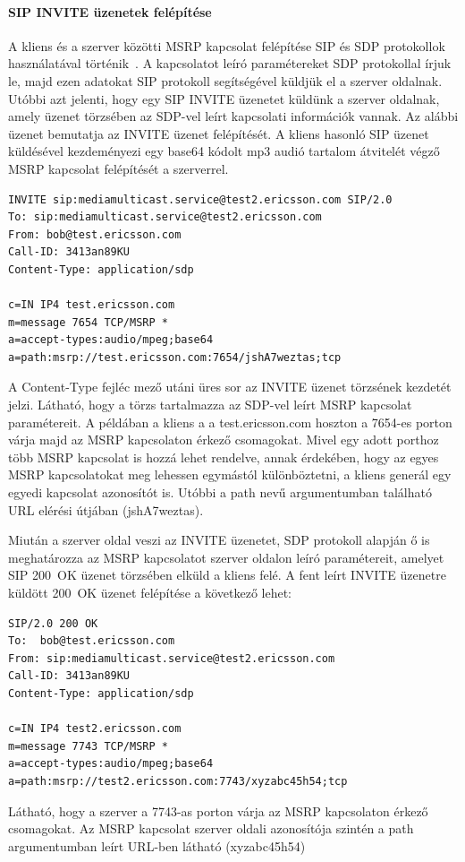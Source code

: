 \paragraph{SIP INVITE üzenetek felépítése\\}
\label{sec:sip_invite}

A kliens és a szerver közötti MSRP kapcsolat felépítése SIP és SDP protokollok használatával történik~\cite{rfc4975}. A kapcsolatot leíró paramétereket SDP protokollal írjuk le, majd ezen adatokat SIP protokoll segítségével küldjük el a szerver oldalnak. Utóbbi azt jelenti, hogy egy SIP INVITE üzenetet küldünk a szerver oldalnak, amely üzenet törzsében az SDP-vel leírt kapcsolati információk vannak. Az alábbi üzenet bemutatja az INVITE üzenet felépítését. A kliens hasonló SIP üzenet küldésével kezdeményezi egy base64 kódolt mp3 audió tartalom átvitelét végző MSRP kapcsolat felépítését a szerverrel.
\medskip
\fontsize{10}{10}
\begin{verbatim}
INVITE sip:mediamulticast.service@test2.ericsson.com SIP/2.0
To: sip:mediamulticast.service@test2.ericsson.com
From: bob@test.ericsson.com
Call-ID: 3413an89KU
Content-Type: application/sdp

c=IN IP4 test.ericsson.com
m=message 7654 TCP/MSRP *
a=accept-types:audio/mpeg;base64
a=path:msrp://test.ericsson.com:7654/jshA7weztas;tcp
\end{verbatim}
\fontsize{12}{12} 
\medskip
A Content-Type fejléc mező utáni üres sor az INVITE üzenet törzsének kezdetét jelzi. Látható, hogy a  törzs tartalmazza az SDP-vel leírt MSRP kapcsolat paramétereit. A példában a kliens a a test.ericsson.com hoszton a 7654-es porton várja majd az MSRP kapcsolaton érkező csomagokat. Mivel egy adott porthoz több MSRP kapcsolat is hozzá lehet rendelve, annak érdekében, hogy az egyes MSRP kapcsolatokat meg lehessen egymástól különböztetni, a kliens generál egy egyedi kapcsolat azonosítót is. Utóbbi a path nevű argumentumban található URL elérési útjában (jshA7weztas). 

Miután a szerver oldal veszi az INVITE üzenetet, SDP protokoll alapján ő is meghatározza az MSRP kapcsolatot szerver oldalon leíró paramétereit, amelyet SIP 200~OK üzenet törzsében elküld a kliens felé. A fent leírt INVITE üzenetre küldött 200~OK üzenet felépítése a következő lehet:
\medskip
\fontsize{10}{10}
\begin{verbatim}
SIP/2.0 200 OK
To:  bob@test.ericsson.com
From: sip:mediamulticast.service@test2.ericsson.com
Call-ID: 3413an89KU
Content-Type: application/sdp

c=IN IP4 test2.ericsson.com
m=message 7743 TCP/MSRP *
a=accept-types:audio/mpeg;base64
a=path:msrp://test2.ericsson.com:7743/xyzabc45h54;tcp
\end{verbatim}
\fontsize{12}{12} 
\medskip
Látható, hogy a szerver a 7743-as porton várja az MSRP kapcsolaton érkező csomagokat. Az MSRP kapcsolat szerver oldali azonosítója szintén a path argumentumban leírt URL-ben látható (xyzabc45h54)

